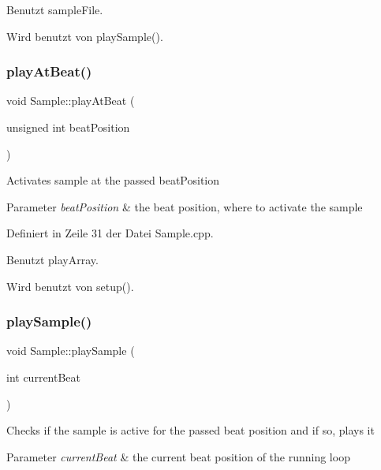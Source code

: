 Benutzt sample\+File.



Wird benutzt von play\+Sample().

\mbox{\label{class_sample_a287eada639aedccb8908d1ae6bf67874}} 
\subsubsection{\texorpdfstring{play\+At\+Beat()}{playAtBeat()}}
{\footnotesize\ttfamily void Sample\+::play\+At\+Beat (\begin{DoxyParamCaption}\item[{unsigned int}]{beat\+Position }\end{DoxyParamCaption})}

Activates sample at the passed beat\+Position 
\begin{DoxyParams}{Parameter}
{\em beat\+Position} & the beat position, where to activate the sample \\
\hline
\end{DoxyParams}


Definiert in Zeile 31 der Datei Sample.\+cpp.



Benutzt play\+Array.



Wird benutzt von setup().

\mbox{\label{class_sample_a5c016261d1f93a28c323a53af3ee545a}} 
\subsubsection{\texorpdfstring{play\+Sample()}{playSample()}}
{\footnotesize\ttfamily void Sample\+::play\+Sample (\begin{DoxyParamCaption}\item[{int}]{current\+Beat }\end{DoxyParamCaption})}

Checks if the sample is active for the passed beat position and if so, plays it 
\begin{DoxyParams}{Parameter}
{\em current\+Beat} & the current beat position of the running loop \\
\hline
\end{DoxyParams}


